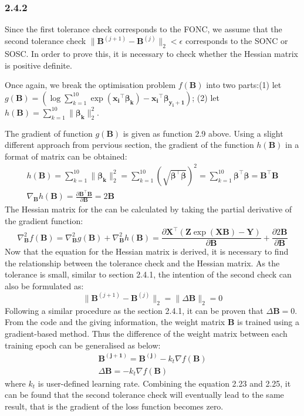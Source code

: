 \documentclass[12pt]{article}
\numberwithin{equation}{section}
\theoremstyle{remark}
\newcommand{\vect}[1]{\boldsymbol{#1}}
\newcommand{\norm}[2]{\|#1\|_{#2}}
\begin{document}
\subsubsection{2.4.2}
Since the first tolerance check corresponds to the FONC, we assume that the second tolerance check $\norm{\vect{B}^{(j+1)}-\vect{B}^{(j)}}{2} < \epsilon$ corresponds to the SONC or SOSC. In order to prove this, it is necessary to check whether the Hessian matrix is positive definite. 

\medskip
Once again, we break the optimisation problem $f(\vect{B})$ into two parts:(1) let $g(\vect{B}) = \left( \log \sum\limits_{k = 1}^{10} \exp \left( \vect{x_i}^{\top} \vect{\beta_k} \right) - \vect{x_i}^{\top} \vect{\beta_{y_i + 1}} \right)$; (2) let $h(\vect{B}) = \sum\limits_{k = 1}^{10} \norm{\vect{\beta_k}}{2}^{2}$.

\medskip
The gradient of function $g(\vect{B})$ is given as function 2.9 above. Using a slight different approach from pervious section, the gradient of the function $h(\vect{B})$ in a format of matrix can be obtained:
\begin{gather}
h(\vect{B}) = \sum\limits_{k = 1}^{10} \norm{\vect{\beta_k}}{2}^{2} = \sum\limits_{k = 1}^{10} \left(\sqrt{\vect{\beta^{\top}\beta}}\right)^{2} = \sum\limits_{k = 1}^{10} \vect{\beta^{\top}\beta} = \vect{B^{\top}B} \\
\nabla_{\vect{B}} h(\vect{B}) = \frac{\partial\vect{B^{\top}B}}{\partial\vect{B}} = 2\vect{B}
\end{gather}
The Hessian matrix for the can be calculated by taking the partial derivative of the gradient function:
\begin{equation}
\nabla_{\vect{B}}^{2} f(\vect{B})=  \nabla_{\vect{B}}^{2} g(\vect{B}) + \nabla_{\vect{B}}^{2} h(\vect{B}) = \frac{\partial\vect{X}^{\top}(\vect{Z} \exp(\vect{X}\vect{B}) - \vect{Y})}{\partial\vect{B}} + \frac{\partial 2\vect{B}}{\partial\vect{B}}
\end{equation}
Now that the equation for the Hessian matrix is derived, it is necessary to find the relationship between the tolerance check and the Hessian matrix. As the tolerance is small, similar to section 2.4.1, the intention of the second check can also be formulated as:
\begin{equation}
\norm{\vect{B}^{(j+1)}-\vect{B}^{(j)}}{2} = \norm{\Delta\vect{B}}{2} = 0
\end{equation}
Following a similar procedure as the section 2.4.1, it can be proven that $\Delta\vect{B} = 0$. From the code and the giving information, the weight matrix $\vect{B}$ is trained using a gradient-based method. Thus the difference of the weight matrix between each training epoch can be generalised as below:
\begin{gather}
\vect{B^{(j+1)}} = \vect{B^{(j)}} - k_t \nabla f(\vect{B}) \\
\Delta\vect{B} = -k_t \nabla f(\vect{B})
\end{gather}
where $k_t$ is user-defined learning rate. Combining the equation 2.23 and 2.25, it can be found that the second tolerance check will eventually lead to the same result, that is the gradient of the loss function becomes zero.
\end{document}
